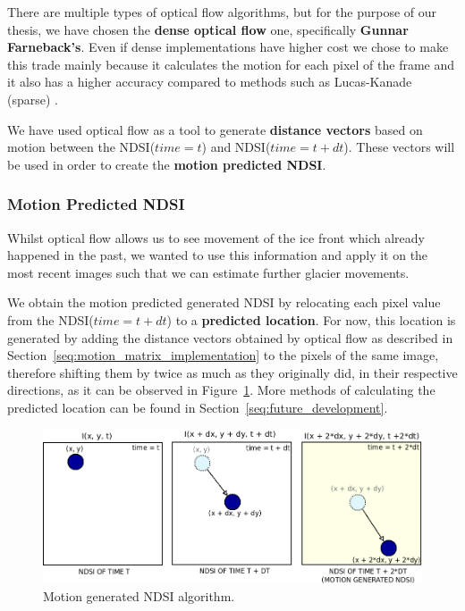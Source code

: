 \documentclass[11pt, a4paper]{report}
\begin{document}
	There are multiple types of optical flow algorithms, but for the purpose of our thesis, we have chosen the \textbf{dense optical flow} one, specifically \textbf{Gunnar Farneback's}. Even if dense implementations have higher cost we chose to make this trade mainly because it calculates the motion for each pixel of the frame and it also has a higher accuracy \cite{orb} compared to methods such as Lucas-Kanade (sparse) \cite{lukas}.
	
	We have used optical flow as a tool to generate \textbf{distance vectors} based on motion between the NDSI(\(time=t\)) and NDSI(\(time=t + dt\)). These vectors will be used in order to create the \textbf{motion predicted NDSI}.

	\subsubsection{Motion Predicted NDSI}
	\label{seq:motion_ndsi_functional}
	
	Whilst optical flow allows us to see movement of the ice front which already happened in the past, we wanted to use this information and apply it on the most recent images such that we can estimate further glacier movements.

	We obtain the motion predicted generated NDSI by relocating each pixel value from the NDSI(\(time=t + dt\)) to a \textbf{predicted location}. For now, this location is generated by adding the distance vectors obtained by optical flow as described in Section~\ref{seq:motion_matrix_implementation} to the pixels of the same image, therefore shifting them by twice as much as they originally did, in their respective directions, as it can be observed in Figure~\ref{fig:motion_generated_schema}. More methods of calculating the predicted location can be found in Section~\ref{seq:future_development}.
	
	\begin{figure}[h]
		\centering
		\includegraphics[scale=0.5]{../images/motion_generated_schema.png}
		\caption{Motion generated NDSI algorithm.}
		\label{fig:motion_generated_schema}
	\end{figure}
\end{document}
